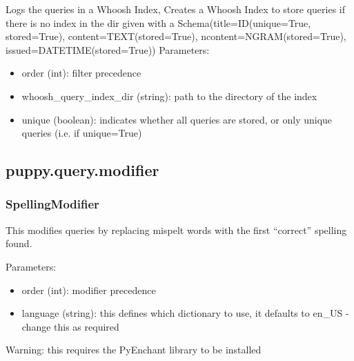 \documentclass[letterpaper,10pt,english]{sphinxmanual}
\begin{document}
\begin{fulllineitems}
\label{api2.0:puppy.query.filter.whooshQueryLogger.WhooshQueryLogger}
Logs the queries in a Whoosh Index, 
Creates a Whoosh Index to store queries if there is no index in the dir given
with a Schema(title=ID(unique=True, stored=True), content=TEXT(stored=True), ncontent=NGRAM(stored=True), issued=DATETIME(stored=True))
Parameters:
\begin{itemize}
\item {} 
order (int): filter precedence

\item {} 
whoosh\_query\_index\_dir (string): path to the directory of the index

\item {} 
unique (boolean): indicates whether all queries are stored, or only unique queries (i.e. if unique=True)

\end{itemize}

\end{fulllineitems}



\subsection{puppy.query.modifier}
\label{api2.0:puppy-query-modifier}\label{api2.0:module-puppy.query.modifier}

\subsubsection{SpellingModifier}
\label{api2.0:spellingmodifier}\label{api2.0:puppy-spelling-mod}

\begin{fulllineitems}
\label{api2.0:puppy.query.modifier.SpellingCorrectingModifier}
This modifies queries by replacing mispelt words with the first ``correct'' spelling found.

Parameters:
\begin{itemize}
\item {} 
order (int): modifier precedence

\item {} 
language (string): this defines which dictionary to use, it defaults to en\_US - change this as required

\end{itemize}

Warning: this requires the PyEnchant library to be installed

\end{fulllineitems}
\end{document}
